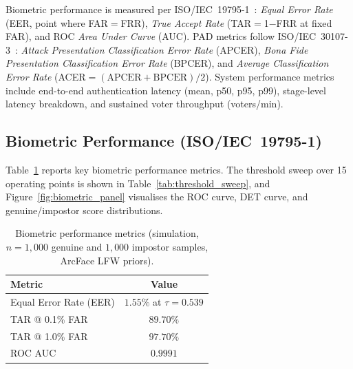 \documentclass[preprint,12pt]{elsarticle}
\begin{document}
Biometric performance is measured per ISO/IEC~19795-1~\cite{iso19795}:
\textit{Equal Error Rate} (EER, point where FAR$=$FRR), \textit{True Accept Rate}
(TAR$=$1$-$FRR at fixed FAR), and ROC \textit{Area Under Curve} (AUC).
PAD metrics follow ISO/IEC~30107-3~\cite{iso30107}: \textit{Attack Presentation
Classification Error Rate} (APCER), \textit{Bona Fide Presentation Classification
Error Rate} (BPCER), and \textit{Average Classification Error Rate} (ACER$=(\text{APCER}+\text{BPCER})/2$).
System performance metrics include end-to-end authentication latency (mean, p50,
p95, p99), stage-level latency breakdown, and sustained voter throughput (voters/min).

\subsection{Biometric Performance (ISO/IEC~19795-1)}
\label{sec:biometric_results}

Table~\ref{tab:biometric} reports key biometric performance metrics.
The threshold sweep over 15 operating points is shown in
Table~\ref{tab:threshold_sweep}, and Figure~\ref{fig:biometric_panel}
visualises the ROC curve, DET curve, and genuine/impostor score
distributions.

\begin{table}[t]
\centering
\caption{Biometric performance metrics (simulation, $n=1{,}000$ genuine
  and $1{,}000$ impostor samples, ArcFace LFW priors).}
\label{tab:biometric}
\begin{tabular}{lc}
  \toprule
  Metric & Value \\
  \midrule
  Equal Error Rate (EER) & $1.55\%$ at $\tau = 0.539$ \\
  TAR @ 0.1\% FAR & $89.70\%$ \\
  TAR @ 1.0\% FAR & $97.70\%$ \\
  ROC AUC & $0.9991$ \\
  \bottomrule
\end{tabular}
\end{table}
\end{document}
